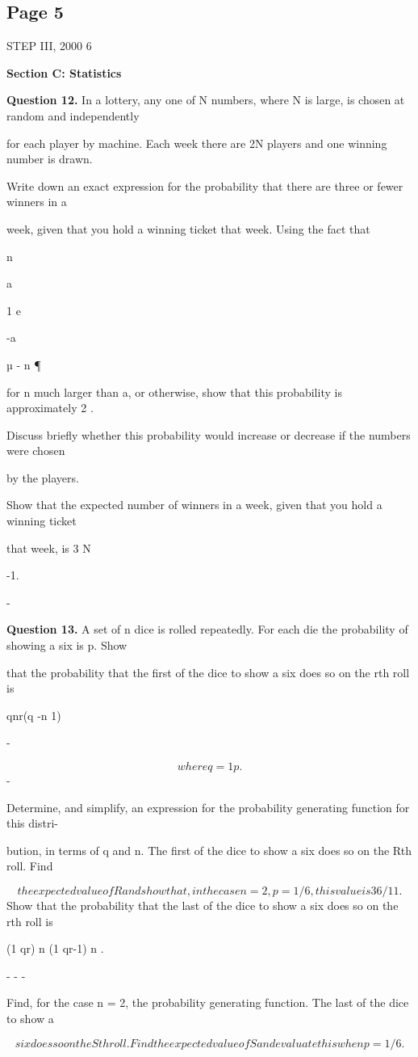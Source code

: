\documentclass[12pt]{article}
\begin{document}
\subsection*{Page 5}
\begin{flushleft}
STEP III, 2000 6\par
\bigskip\textbf{Section C: Statistics}\par
\bigskip\textbf{Question 12.} In a lottery, any one of N numbers, where N is large, is chosen at random and independently\par
for each player by machine. Each week there are 2N players and one winning number is drawn.\par
Write down an exact expression for the probability that there are three or fewer winners in a\par
week, given that you hold a winning ticket that week. Using the fact that\par
n\par
a\par
1 e\par
-a\par
µ - n ¶ \approx\par
for n much larger than a, or otherwise, show that this probability is approximately 2 .\par
Discuss briefly whether this probability would increase or decrease if the numbers were chosen\par
by the players.\par
Show that the expected number of winners in a week, given that you hold a winning ticket\par
that week, is 3 N\par
-1.\par
-\par
\bigskip\textbf{Question 13.} A set of n dice is rolled repeatedly. For each die the probability of showing a six is p. Show\par
that the probability that the first of the dice to show a six does so on the rth roll is\par
qnr(q -n 1)\par
-\par
\[where q = 1 p.\]
-\par
Determine, and simplify, an expression for the probability generating function for this distri-\par
bution, in terms of q and n. The first of the dice to show a six does so on the Rth roll. Find\par
\[the expected value of R and show that, in the case n = 2, p = 1/6, this value is 36/11.\]
Show that the probability that the last of the dice to show a six does so on the rth roll is\par
(1 qr) n (1 qr-1) n .\par
- - -\par
Find, for the case n = 2, the probability generating function. The last of the dice to show a\par
\[six does so on the Sth roll. Find the expected value of S and evaluate this when p = 1/6.\]
\end{flushleft}
\end{document}
